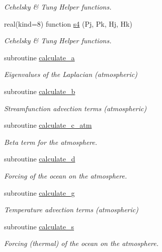 \begin{DoxyCompactItemize}
\begin{DoxyCompactList}\small\item\em Cehelsky \& Tung Helper functions. \end{DoxyCompactList}\item 
real(kind=8) function \hyperlink{namespaceinprod__analytic_a8dacf930ffdf8fd09da0a77bfd4d3a4b}{s4} (Pj, Pk, Hj, Hk)
\begin{DoxyCompactList}\small\item\em Cehelsky \& Tung Helper functions. \end{DoxyCompactList}\item 
subroutine \hyperlink{namespaceinprod__analytic_a9a003ced8e18bf5299c05dc76a8b1e47}{calculate\+\_\+a}
\begin{DoxyCompactList}\small\item\em Eigenvalues of the Laplacian (atmospheric) \end{DoxyCompactList}\item 
subroutine \hyperlink{namespaceinprod__analytic_ab2db39e602d165af9d709d712ebf1b1d}{calculate\+\_\+b}
\begin{DoxyCompactList}\small\item\em Streamfunction advection terms (atmospheric) \end{DoxyCompactList}\item 
subroutine \hyperlink{namespaceinprod__analytic_afa4abc3665e4628bda2deb421c123e05}{calculate\+\_\+c\+\_\+atm}
\begin{DoxyCompactList}\small\item\em Beta term for the atmosphere. \end{DoxyCompactList}\item 
subroutine \hyperlink{namespaceinprod__analytic_a1b0c41711a02f385766aeef2faf22830}{calculate\+\_\+d}
\begin{DoxyCompactList}\small\item\em Forcing of the ocean on the atmosphere. \end{DoxyCompactList}\item 
subroutine \hyperlink{namespaceinprod__analytic_a60bd361584d695120fff51940e523f0e}{calculate\+\_\+g}
\begin{DoxyCompactList}\small\item\em Temperature advection terms (atmospheric) \end{DoxyCompactList}\item 
subroutine \hyperlink{namespaceinprod__analytic_af2f7504623cdd4e4e6b4b977126475ea}{calculate\+\_\+s}
\begin{DoxyCompactList}\small\item\em Forcing (thermal) of the ocean on the atmosphere. \end{DoxyCompactList}\item 

\end{DoxyCompactItemize}
